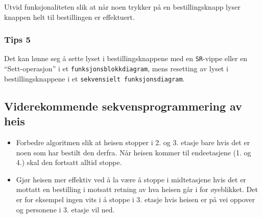 Utvid funksjonaliteten slik at når noen trykker på en bestillingsknapp lyser knappen helt til bestillingen er effektuert.


\subsubsection*{Tips 5}
Det kan lønne seg å sette lyset i bestillingsknappene med en \verb|SR|-vippe eller en “Sett-operasjon” i et \verb|funksjonsblokkdiagram|, mens resetting av lyset i bestillingsknappene i et \verb|sekvensielt funksjonsdiagram|.

\subsection{Viderekommende sekvensprogrammering av heis}

\begin{itemize}
    \item Forbedre algoritmen slik at heisen stopper i 2. og 3. etasje bare hvis det er noen som har bestilt den derfra. Når heisen kommer til endeetasjene (1. og 4.) skal den fortsatt alltid stoppe.

\item Gjør heisen mer effektiv ved å la være å stoppe i midtetasjene hvis det er mottatt en
bestilling i motsatt retning av hva heisen går i for øyeblikket. Det er for eksempel ingen vits
i å stoppe i 3. etasje hvis heisen er på vei oppover og personene i 3. etasje vil ned.
\end{itemize}


